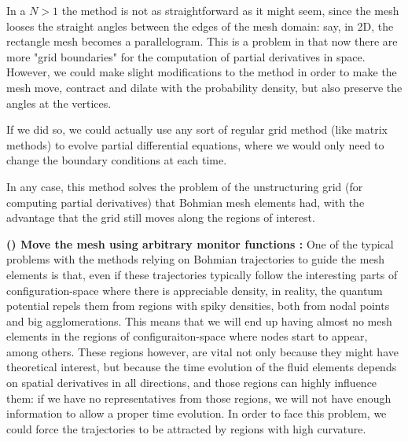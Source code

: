 \documentclass[11pt, a4paper]{article} %
\begin{document}
In a $N>1$ the method is not as straightforward as it might seem, since the mesh looses the straight angles between the edges of the mesh domain: say, in 2D, the rectangle mesh becomes a parallelogram. This is a problem in that now there are more "grid boundaries" for the computation of partial derivatives in space. However, we could make slight modifications to the method in order to make the mesh move, contract and dilate with the probability density, but also preserve the angles at the vertices.

If we did so, we could actually use any sort of regular grid method (like matrix methods) to evolve partial differential equations, where we would only need to change the boundary conditions at each time.

In any case, this method solves the problem of the unstructuring grid (for computing partial derivatives) that Bohmian mesh elements had, with the advantage that the grid still moves along the regions of interest.

{\bf (\textgamma) Move the mesh using arbitrary monitor functions :} One of the typical problems with the methods relying on Bohmian trajectories to guide the mesh elements is that, even if these trajectories typically follow the interesting parts of configuration-space where there is appreciable density, in reality, the quantum potential repels them from regions with spiky densities, both from nodal points and big agglomerations. This means that we will end up having almost no mesh elements in the regions of configuraiton-space where nodes start to appear, among others. These regions however, are vital not only because they might have theoretical interest, but because the time evolution of the fluid elements depends on spatial derivatives in all directions, and those regions can highly influence them: if we have no representatives from those regions, we will not have enough information to allow a proper time evolution. In order to face this problem, we could force the trajectories to be attracted by regions with high curvature.
\end{document}
